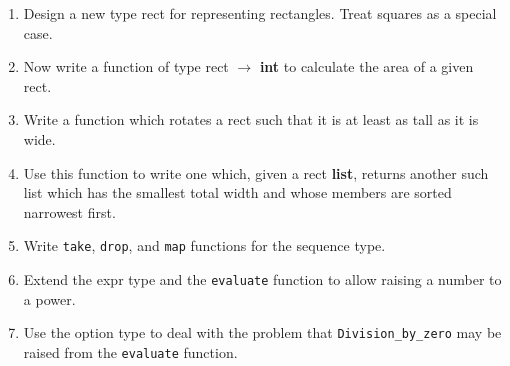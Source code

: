 \documentclass[]{book}
\begin{document}
\begin{enumerate}
  \item Design a new type \textrm{rect} for representing rectangles. Treat squares as a special case.
  \item Now write a function of type \textrm{rect $\rightarrow$ \textbf{int}} to calculate the area of a given \textrm{rect}.
  \item Write a function which rotates a \textrm{rect} such that it is at least as tall as it is wide.
  \item Use this function to write one which, given a \textrm{rect \textbf{list}}, returns another such list which has the smallest total width and whose members are sorted narrowest first.
  \item Write \texttt{take}, \texttt{drop}, and \texttt{map} functions for the \textrm{sequence} type.
  \item Extend the \textrm{expr} type and the \texttt{evaluate} function to allow raising a number to a power.
  \item Use the \textrm{option} type to deal with the problem that \texttt{Division\_by\_zero} may be raised from the \texttt{evaluate} function.
\end{enumerate}

\cleardoublepage
\thispagestyle{empty}
\chapter*{}
\\
\end{document}
